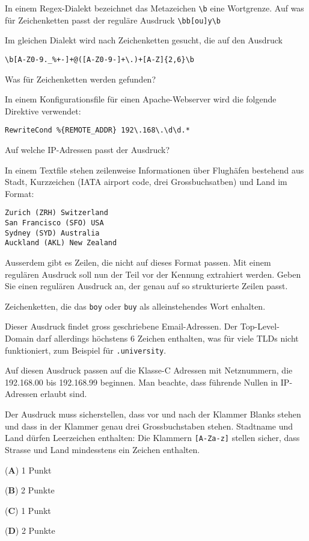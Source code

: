 \begin{teilaufgaben}
\item
In einem Regex-Dialekt bezeichnet das Metazeichen \texttt{\textbackslash{}b}
eine Wortgrenze.
Auf was für Zeichenketten passt der reguläre Ausdruck
\texttt{\textbackslash{}bb[ou]y\textbackslash{}b}
\item
Im gleichen Dialekt wird nach Zeichenketten gesucht, die auf den Ausdruck
\begin{verbatim}
\b[A-Z0-9._%+-]+@([A-Z0-9-]+\.)+[A-Z]{2,6}\b
\end{verbatim}
Was für Zeichenketten werden gefunden?
\item
In einem Konfigurationsfile für einen Apache-Webserver wird die folgende
Direktive verwendet:
\begin{verbatim}
RewriteCond %{REMOTE_ADDR} 192\.168\.\d\d.*
\end{verbatim}
Auf welche IP-Adressen passt der Ausdruck?
\item
In einem Textfile stehen zeilenweise Informationen über Flughäfen bestehend
aus Stadt, Kurzzeichen (IATA airport code, drei Grossbuchsatben) und Land
im Format:
\begin{verbatim}
Zurich (ZRH) Switzerland
San Francisco (SFO) USA
Sydney (SYD) Australia
Auckland (AKL) New Zealand
\end{verbatim}
Ausserdem gibt es Zeilen, die nicht auf dieses Format passen.
Mit einem regulären Ausdruck soll nun der Teil vor der Kennung extrahiert
werden. 
Geben Sie einen regulären Ausdruck an, der genau auf so strukturierte
Zeilen passt.
\end{teilaufgaben}


\begin{loesung}
\begin{teilaufgaben}
\item
Zeichenketten, die das \texttt{boy} oder \texttt{buy} als
alleinstehendes Wort enhalten.
\item
Dieser Ausdruck findet gross geschriebene Email-Adressen.
Der Top-Level-Domain darf allerdings höchstens 6 Zeichen enthalten,
was für viele TLDs nicht funktioniert, zum Beispiel für \texttt{.university}.
\item
Auf diesen Ausdruck passen auf die Klasse-C Adressen mit Netznummern, die
 192.168.00 bis 192.168.99 beginnen.
Man beachte, dass führende Nullen in IP-Adressen erlaubt sind.
\item
Der Ausdruck muss sicherstellen, dass vor und nach der Klammer Blanks stehen
und dass in der Klammer genau drei Grossbuchstaben stehen.
Stadtname und Land dürfen Leerzeichen enthalten:
Die Klammern \texttt{[A-Za-z]} stellen sicher, dass Strasse und Land
mindesstens ein Zeichen enthalten.
\end{teilaufgaben}
\end{loesung}

\begin{bewertung}
\begin{teilaufgaben}
\item ({\bf A}) 1 Punkt
\item ({\bf B}) 2 Punkte
\item ({\bf C}) 1 Punkt
\item ({\bf D}) 2 Punkte
\end{teilaufgaben}
\end{bewertung}


